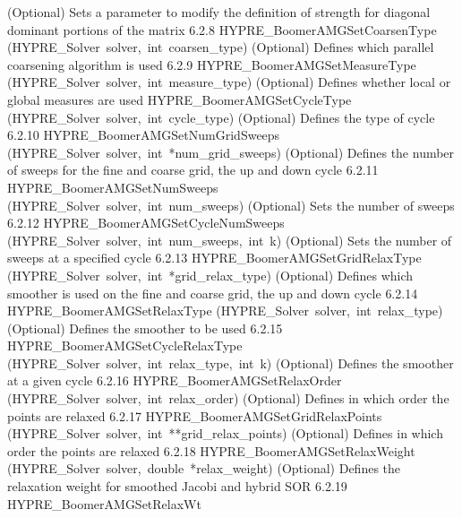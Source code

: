 \documentclass{article}
\begin{document}
\begin{cxxentry}
\begin{cxxentry}
\begin{cxxnames}
{(Optional) Sets a parameter to modify the definition of strength for
diagonal dominant portions of the matrix}
        {6.2.8}
        {HYPRE\_BoomerAMGSetCoarsenType}
        {(HYPRE\_Solver\ solver,\ int\ coarsen\_type)}
        {
(Optional) Defines which parallel coarsening algorithm is used}
        {6.2.9}
        {HYPRE\_BoomerAMGSetMeasureType}
        {(HYPRE\_Solver\ solver,\ int\ measure\_type)}
        {
(Optional) Defines whether local or global measures are used}
        {}
\label{cxx.6.2.57}
        {HYPRE\_BoomerAMGSetCycleType}
        {(HYPRE\_Solver\ solver,\ int\ cycle\_type)}
        {
(Optional) Defines the type of cycle}
        {6.2.10}
        {HYPRE\_BoomerAMGSetNumGridSweeps}
        {(HYPRE\_Solver\ solver,\ int\ *num\_grid\_sweeps)}
        {
(Optional) Defines the number of sweeps for the fine and coarse grid, 
the up and down cycle}
        {6.2.11}
        {HYPRE\_BoomerAMGSetNumSweeps}
        {(HYPRE\_Solver\ solver,\ int\ num\_sweeps)}
        {
(Optional) Sets the number of sweeps}
        {6.2.12}
        {HYPRE\_BoomerAMGSetCycleNumSweeps}
        {(HYPRE\_Solver\ solver,\ int\ num\_sweeps,\ int\ k)}
        {
(Optional) Sets the number of sweeps at a specified cycle}
        {6.2.13}
        {HYPRE\_BoomerAMGSetGridRelaxType}
        {(HYPRE\_Solver\ solver,\ int\ *grid\_relax\_type)}
        {
(Optional) Defines which smoother is used on the fine and coarse grid, 
the up and down cycle}
        {6.2.14}
        {HYPRE\_BoomerAMGSetRelaxType}
        {(HYPRE\_Solver\ solver,\ int\ relax\_type)}
        {
(Optional) Defines the smoother to be used}
        {6.2.15}
        {HYPRE\_BoomerAMGSetCycleRelaxType}
        {(HYPRE\_Solver\ solver,\ int\ relax\_type,\ int\ k)}
        {
(Optional) Defines the smoother at a given cycle}
        {6.2.16}
        {HYPRE\_BoomerAMGSetRelaxOrder}
        {(HYPRE\_Solver\ solver,\ int\ relax\_order)}
        {
(Optional) Defines in which order the points are relaxed}
        {6.2.17}
        {HYPRE\_BoomerAMGSetGridRelaxPoints}
        {(HYPRE\_Solver\ solver,\ int\ **grid\_relax\_points)}
        {
(Optional) Defines in which order the points are relaxed}
        {6.2.18}
        {HYPRE\_BoomerAMGSetRelaxWeight}
        {(HYPRE\_Solver\ solver,\ double\ *relax\_weight)}
        {
(Optional) Defines the relaxation weight for smoothed Jacobi and hybrid SOR}
        {6.2.19}
        {HYPRE\_BoomerAMGSetRelaxWt}

\end{cxxnames}
\end{cxxentry}
\end{cxxentry}
\end{document}
